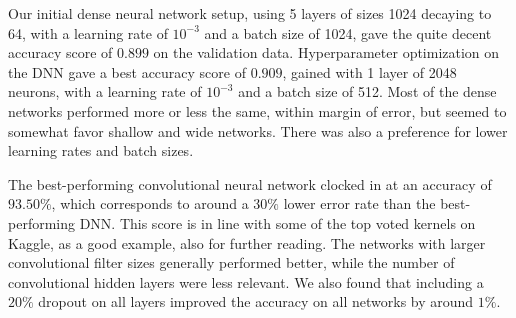\documentclass[10pt, twocolumn]{article}
\begin{document}


Our initial dense neural network setup, using 5 layers of sizes 1024 decaying to 64, with a learning rate of $10^{-3}$ and a batch size of 1024, gave the quite decent accuracy score of $0.899$ on the validation data. Hyperparameter optimization on the DNN gave a best accuracy score of $0.909$, gained with 1 layer of 2048 neurons, with a learning rate of $10^{-3}$ and a batch size of 512. Most of the dense networks performed more or less the same, within margin of error, but seemed to somewhat favor shallow and wide networks. There was also a preference for lower learning rates and batch sizes.

The best-performing convolutional neural network clocked in at an accuracy of $93.50\%$, which corresponds to around a $30\%$ lower error rate than the best-performing DNN. This score is in line with some of the top voted kernels on Kaggle, \cite{Kaggle_kernel} as a good example, also for further reading. The networks with larger convolutional filter sizes generally performed better, while the number of convolutional hidden layers were less relevant. We also found that including a $20\%$ dropout on all layers improved the accuracy on all networks by around $1\%$.
\end{document}
